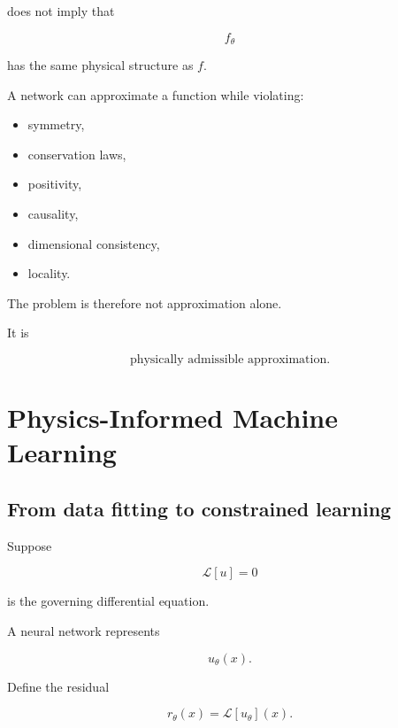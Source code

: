 \documentclass[11pt,a4paper,oneside]{book}
\begin{document}
does not imply that

\begin{equation}
f_\theta
\end{equation}

has the same physical structure as $f$.

A network can approximate a function while violating:

\begin{itemize}
\item symmetry,
\item conservation laws,
\item positivity,
\item causality,
\item dimensional consistency,
\item locality.
\end{itemize}

The problem is therefore not approximation alone.

It is

\begin{equation}
\boxed{
\text{physically admissible approximation}.
}
\end{equation}

\chapter{Physics-Informed Machine Learning}

\section{From data fitting to constrained learning}

Suppose

\begin{equation}
\mathcal{L}[u]=0
\end{equation}

is the governing differential equation.

A neural network represents

\begin{equation}
u_\theta(x).
\end{equation}

Define the residual

\begin{equation}
r_\theta(x)
=
\mathcal{L}[u_\theta](x).
\end{equation}
\end{document}
